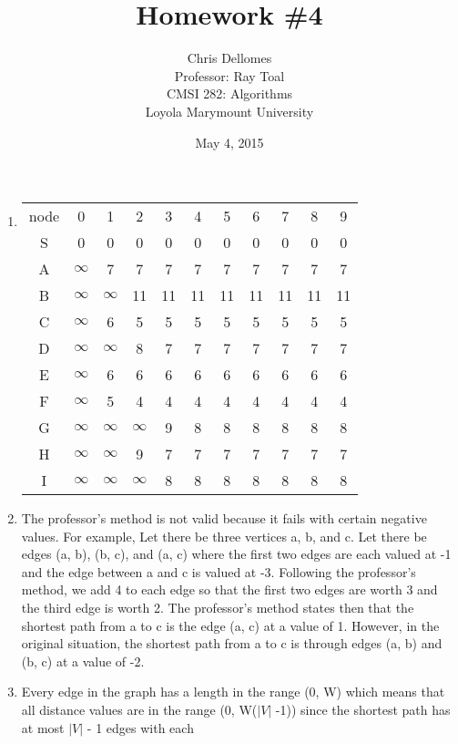 \documentclass{article}
\begin{document}
\title{Homework \#4}
\author{Chris Dellomes\\
Professor: Ray Toal\\
CMSI 282: Algorithms\\
Loyola Marymount University}
\date{May 4, 2015}

\maketitle

\clearpage
\begin{enumerate}
	\item \begin{tabular}{c c c c c c c c c c c}
	node & 0 & 1 & 2 & 3 & 4 & 5 & 6 & 7 & 8 & 9 \\
	S & 0 & 0 & 0 & 0 & 0 & 0 & 0 & 0 & 0 & 0 \\
	A & $\infty$ & 7 & 7 & 7 & 7 & 7 & 7 & 7 & 7 & 7 \\
	B & $\infty$ & $\infty$ & 11 & 11 & 11 & 11 & 11 & 11 & 11 & 11 \\
	C & $\infty$ & 6 & 5 & 5 & 5 & 5 & 5 & 5 & 5 & 5 \\
	D & $\infty$ & $\infty$ & 8 & 7 & 7 & 7 & 7 & 7 & 7 & 7 \\
	E & $\infty$ & 6 & 6 & 6 & 6 & 6 & 6 & 6 & 6 & 6 \\
	F & $\infty$ & 5 & 4 & 4 & 4 & 4 & 4 & 4 & 4 & 4 \\
	G & $\infty$ & $\infty$ & $\infty$ & 9 & 8 & 8 & 8 & 8 & 8 & 8 \\
	H & $\infty$ & $\infty$ & 9 & 7 & 7 & 7 & 7 & 7 & 7 & 7 \\
	I & $\infty$ & $\infty$ & $\infty$ & 8 & 8 & 8 & 8 & 8 & 8 & 8 \\
	\end{tabular}
	\item The professor's method is not valid because it fails with certain negative values. For example, Let there be three vertices a, b, and c. Let there be edges (a, b), (b, c), and (a, c)
	where the first two edges are each valued at -1 and the edge between a and c is valued at -3. Following the professor's method, we add 4 to each edge so that the first two edges are worth
	3 and the third edge is worth 2. The professor's method states then that the shortest path from a to c is the edge (a, c) at a value of 1. However, in the original situation, the shortest
	path from a to c is through edges (a, b) and (b, c) at a value of -2.
	\item Every edge in the graph has a length in the range (0, W) which means that all distance values are in the range (0, W($|V|$ -1)) since the shortest path has at most $|V|$ - 1 edges with each 

\end{enumerate}
\end{document}

